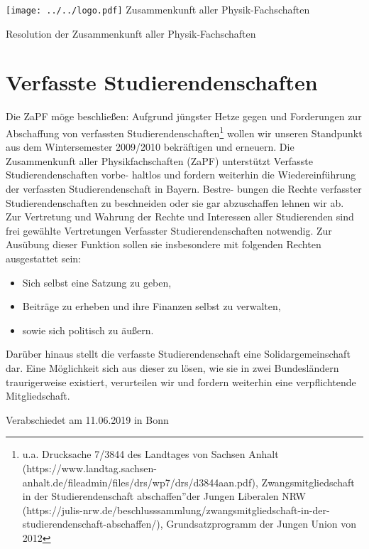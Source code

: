 \documentclass[DIV=calc]{scrartcl}
\begin{document}
    \hspace{0.87\textwidth}
    \begin{minipage}{120pt}
        \vspace{-1.8cm}
        \texttt{[image: ../../logo.pdf]}
        \centering
        \small Zusammenkunft aller Physik-Fachschaften
    \end{minipage}
    \begin{center}
        \huge{Resolution der Zusammenkunft aller Physik-Fachschaften}\vspace{.25\baselineskip}\\
        \normalsize
    \end{center}
    \vspace{1cm}

\section*{Verfasste Studierendenschaften}
Die ZaPF möge beschließen:
Aufgrund jüngster Hetze gegen und Forderungen zur Abschaffung von verfassten Studierendenschaften\footnote{u.a. Drucksache 7/3844 des Landtages von Sachsen Anhalt (https://www.landtag.sachsen-anhalt.de/fileadmin/files/drs/wp7/drs/d3844aan.pdf), Zwangsmitgliedschaft in der Studierendenschaft abschaffen”der Jungen Liberalen NRW (https://julis-nrw.de/beschlusssammlung/zwangsmitgliedschaft-in-der-studierendenschaft-abschaffen/), Grundsatzprogramm der Jungen Union von 2012} wollen wir unseren Standpunkt aus dem Wintersemester 2009/2010 bekräftigen und erneuern.
Die Zusammenkunft aller Physikfachschaften (ZaPF) unterstützt Verfasste Studierendenschaften vorbe-
haltlos und fordern weiterhin die Wiedereinführung der verfassten Studierendenschaft in Bayern. Bestre-
bungen die Rechte verfasster Studierendenschaften zu beschneiden oder sie gar abzuschaffen lehnen wir
ab.\\
Zur Vertretung und Wahrung der Rechte und Interessen aller Studierenden sind frei gewählte Vertretungen
Verfasster Studierendenschaften notwendig. Zur Ausübung dieser Funktion sollen sie insbesondere mit
folgenden Rechten ausgestattet sein:\\
\begin{itemize}
\item Sich selbst eine Satzung zu geben,
\item Beiträge zu erheben und ihre Finanzen selbst zu verwalten,
\item sowie sich politisch zu äußern.
\end{itemize}
Darüber hinaus stellt die verfasste Studierendenschaft eine Solidargemeinschaft dar. Eine Möglichkeit sich
aus dieser zu lösen, wie sie in zwei Bundesländern traurigerweise existiert, verurteilen wir und fordern
weiterhin eine verpflichtende Mitgliedschaft.\\


\vspace*{\fill}
\begin{flushright}
Verabschiedet am 11.06.2019 in Bonn
\end{flushright}
\end{document}
